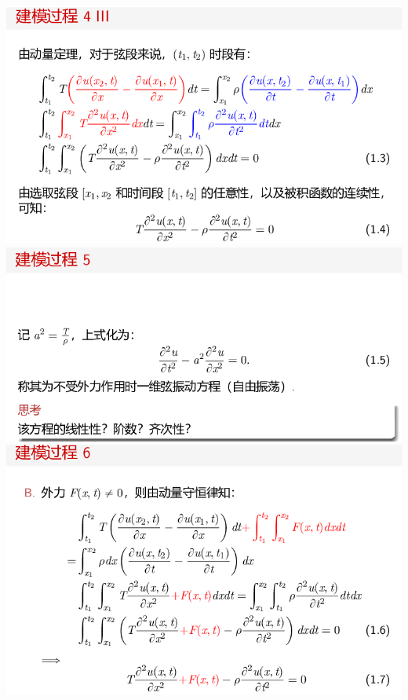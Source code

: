 \documentclass[11pt,a4paper]{ctexart}
\begin{document}
\begin{paracol}{2}
\includegraphics[width=\linewidth]{chap01_15.png}
\includegraphics[width=\linewidth]{chap01_16.png}
\includegraphics[width=\linewidth]{chap01_17.png}
\newpage


\end{paracol}
\end{document}
